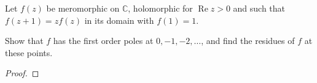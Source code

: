 \documentclass{article}
\newenvironment{problem}[2][Problem]{\begin{trivlist}
\item[\hskip \labelsep {\bfseries #1}\hskip \labelsep {\bfseries #2.}]}{\end{trivlist}}
\begin{document}
\pagebreak

\begin{problem}{4}
  Let $f(z)$ be meromorphic on $\mathbb C$, holomorphic for
  $\operatorname{Re} z > 0$ and such that $f(z + 1) = zf(z)$ in its domain with
  $f(1) = 1$.

  Show that $f$ has the first order poles at $0, -1, -2, \hdots$, and find the 
  residues of $f$ at these points.
\end{problem}

\begin{proof}
\end{proof}
\end{document}
